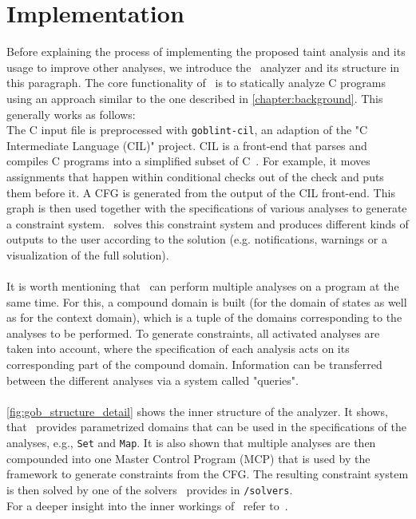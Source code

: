   \section{Implementation}\label{sec:implementation}
  Before explaining the process of implementing the proposed taint analysis and its usage to improve other analyses, we introduce the \gob\ analyzer and its structure in this paragraph. The core functionality of \gob\ is to statically analyze C programs using an approach similar to the one described in \autoref{chapter:background}. This generally works as follows:\\
  The C input file is preprocessed with \texttt{goblint-cil}, an adaption of the "C Intermediate Language (CIL)" project. CIL is a front-end that parses and compiles C programs into a simplified subset of C~\parencite{goblintCil}. For example, it moves assignments that happen within conditional checks out of the check and puts them before it. A CFG is generated from the output of the CIL front-end. This graph is then used together with the specifications of various analyses to generate a constraint system. \gob\ solves this constraint system and produces different kinds of outputs to the user according to the solution (e.g. notifications, warnings or a visualization of the full solution).\\
  \\
  It is worth mentioning that \gob\ can perform multiple analyses on a program at the same time. For this, a compound domain is built (for the domain of states as well as for the context domain), which is a tuple of the domains corresponding to the analyses to be performed. To generate constraints, all activated analyses are taken into account, where the specification of each analysis acts on its corresponding part of the compound domain. Information can be transferred between the different analyses via a system called "queries".\\
  \\
  \autoref{fig:gob_structure_detail} shows the inner structure of the analyzer. It shows, that \gob\ provides parametrized domains that can be used in the specifications of the analyses, e.g., \texttt{Set} and \texttt{Map}. It is also shown that multiple analyses are then compounded into one Master Control Program (MCP) that is used by the framework to generate constraints from the CFG. The resulting constraint system is then solved by one of the solvers \gob\ provides in \texttt{/solvers}.\\  
  For a deeper insight into the inner workings of \gob\ refer to~\parencite{apinis2014frameworks}.
  
